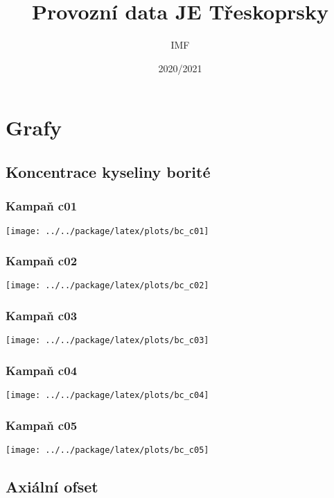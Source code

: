 \documentclass[a4paper,twoside,11pt]{article}
\title{Provozní data JE Třeskoprsky}
\author{IMF}
\date{2020/2021}
\begin{document}
\maketitle
\tableofcontents

\section{Grafy}

\subsection{Koncentrace kyseliny borité}


\subsubsection{Kampaň c01}

\texttt{[image: ../../package/latex/plots/bc\_c01]}

\subsubsection{Kampaň c02}

\texttt{[image: ../../package/latex/plots/bc\_c02]}

\subsubsection{Kampaň c03}

\texttt{[image: ../../package/latex/plots/bc\_c03]}

\subsubsection{Kampaň c04}

\texttt{[image: ../../package/latex/plots/bc\_c04]}

\subsubsection{Kampaň c05}

\texttt{[image: ../../package/latex/plots/bc\_c05]}


\subsection{Axiální ofset}
\end{document}
